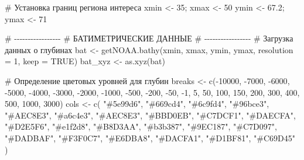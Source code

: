 \documentclass[
  letterpaper,
  DIV=11,
  numbers=noendperiod]{scrreprt}
\newenvironment{Shaded}{\begin{snugshade}}{\end{snugshade}}
\newcommand{\AttributeTok}[1]{\textcolor[rgb]{0.40,0.45,0.13}{#1}}
\newcommand{\CommentTok}[1]{\textcolor[rgb]{0.37,0.37,0.37}{#1}}
\newcommand{\ConstantTok}[1]{\textcolor[rgb]{0.56,0.35,0.01}{#1}}
\newcommand{\DecValTok}[1]{\textcolor[rgb]{0.68,0.00,0.00}{#1}}
\newcommand{\FloatTok}[1]{\textcolor[rgb]{0.68,0.00,0.00}{#1}}
\newcommand{\FunctionTok}[1]{\textcolor[rgb]{0.28,0.35,0.67}{#1}}
\newcommand{\NormalTok}[1]{\textcolor[rgb]{0.00,0.23,0.31}{#1}}
\newcommand{\OtherTok}[1]{\textcolor[rgb]{0.00,0.23,0.31}{#1}}
\newcommand{\SpecialCharTok}[1]{\textcolor[rgb]{0.37,0.37,0.37}{#1}}
\newcommand{\StringTok}[1]{\textcolor[rgb]{0.13,0.47,0.30}{#1}}
\begin{document}
\begin{Shaded}
\begin{Highlighting}[]
\CommentTok{\# Установка границ региона интереса}
\NormalTok{xmin }\OtherTok{\textless{}{-}} \DecValTok{35}\NormalTok{; xmax }\OtherTok{\textless{}{-}} \DecValTok{50}
\NormalTok{ymin }\OtherTok{\textless{}{-}} \FloatTok{67.2}\NormalTok{; ymax }\OtherTok{\textless{}{-}} \DecValTok{71}

\CommentTok{\# {-}{-}{-}{-}{-}{-}{-}{-}{-}{-}{-}{-}{-}{-}{-}{-}{-}}
\CommentTok{\# БАТИМЕТРИЧЕСКИЕ ДАННЫЕ}
\CommentTok{\# {-}{-}{-}{-}{-}{-}{-}{-}{-}{-}{-}{-}{-}{-}{-}{-}{-}}
\CommentTok{\# Загрузка данных о глубинах}
\NormalTok{bat }\OtherTok{\textless{}{-}} \FunctionTok{getNOAA.bathy}\NormalTok{(xmin, xmax, ymin, ymax, }\AttributeTok{resolution =} \DecValTok{1}\NormalTok{, }\AttributeTok{keep =} \ConstantTok{TRUE}\NormalTok{)}
\NormalTok{bat\_xyz }\OtherTok{\textless{}{-}} \FunctionTok{as.xyz}\NormalTok{(bat)}

\CommentTok{\# Определение цветовых уровней для глубин}
\NormalTok{breaks }\OtherTok{\textless{}{-}} \FunctionTok{c}\NormalTok{(}\SpecialCharTok{{-}}\DecValTok{10000}\NormalTok{, }\SpecialCharTok{{-}}\DecValTok{7000}\NormalTok{, }\SpecialCharTok{{-}}\DecValTok{6000}\NormalTok{, }\SpecialCharTok{{-}}\DecValTok{5000}\NormalTok{, }\SpecialCharTok{{-}}\DecValTok{4000}\NormalTok{, }\SpecialCharTok{{-}}\DecValTok{3000}\NormalTok{, }\SpecialCharTok{{-}}\DecValTok{2000}\NormalTok{, }\SpecialCharTok{{-}}\DecValTok{1000}\NormalTok{, }
            \SpecialCharTok{{-}}\DecValTok{500}\NormalTok{, }\SpecialCharTok{{-}}\DecValTok{200}\NormalTok{, }\SpecialCharTok{{-}}\DecValTok{50}\NormalTok{, }\SpecialCharTok{{-}}\DecValTok{1}\NormalTok{, }\DecValTok{5}\NormalTok{, }\DecValTok{50}\NormalTok{, }\DecValTok{100}\NormalTok{, }\DecValTok{150}\NormalTok{, }\DecValTok{200}\NormalTok{, }\DecValTok{300}\NormalTok{, }\DecValTok{400}\NormalTok{, }\DecValTok{500}\NormalTok{, }\DecValTok{1000}\NormalTok{, }\DecValTok{3000}\NormalTok{)}
\NormalTok{cols }\OtherTok{\textless{}{-}} \FunctionTok{c}\NormalTok{(}
  \StringTok{"\#5e99d6"}\NormalTok{, }\StringTok{"\#669cd4"}\NormalTok{, }\StringTok{"\#6c9fd4"}\NormalTok{, }\StringTok{"\#96bce3"}\NormalTok{, }\StringTok{"\#AEC8E3"}\NormalTok{, }\StringTok{"\#a6c4e3"}\NormalTok{,}
  \StringTok{"\#AEC8E3"}\NormalTok{, }\StringTok{"\#BBD0EB"}\NormalTok{, }\StringTok{"\#C7DCF1"}\NormalTok{, }\StringTok{"\#DAECFA"}\NormalTok{, }\StringTok{"\#D2E5F6"}\NormalTok{, }\StringTok{"\#e1f2d8"}\NormalTok{,}
  \StringTok{"\#B8D3AA"}\NormalTok{, }\StringTok{"\#b3b387"}\NormalTok{, }\StringTok{"\#9EC187"}\NormalTok{, }\StringTok{"\#C7D097"}\NormalTok{, }\StringTok{"\#DADBAF"}\NormalTok{, }\StringTok{"\#F3F0C7"}\NormalTok{,}
  \StringTok{"\#E6DBA8"}\NormalTok{, }\StringTok{"\#DACFA1"}\NormalTok{, }\StringTok{"\#D1BF81"}\NormalTok{, }\StringTok{"\#C69D45"}
\NormalTok{)}


\end{Highlighting}
\end{Shaded}
\end{document}
